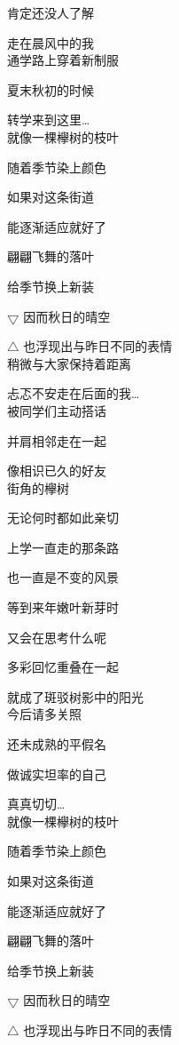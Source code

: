 肯定还没人了解

走在晨风中的我
\\

通学路上穿着新制服

夏末秋初的时候

转学来到这里…
\\

就像一棵欅树的枝叶

随着季节染上颜色

如果对这条街道

能逐渐适应就好了

翩翩飞舞的落叶

给季节换上新装

$\bigtriangledown$ 因而秋日的晴空

$\bigtriangleup$ 也浮现出与昨日不同的表情
\\

稍微与大家保持着距离

忐忑不安走在后面的我…
\\

被同学们主动搭话

并肩相邻走在一起

像相识已久的好友
\\

街角的欅树

无论何时都如此亲切

上学一直走的那条路

也一直是不变的风景

等到来年嫩叶新芽时

又会在思考什么呢

多彩回忆重叠在一起

就成了斑驳树影中的阳光
\\

今后请多关照

还未成熟的平假名

做诚实坦率的自己

真真切切…
\\

就像一棵欅树的枝叶

随着季节染上颜色

如果对这条街道

能逐渐适应就好了

翩翩飞舞的落叶

给季节换上新装

$\bigtriangledown$ 因而秋日的晴空

$\bigtriangleup$ 也浮现出与昨日不同的表情
\\
